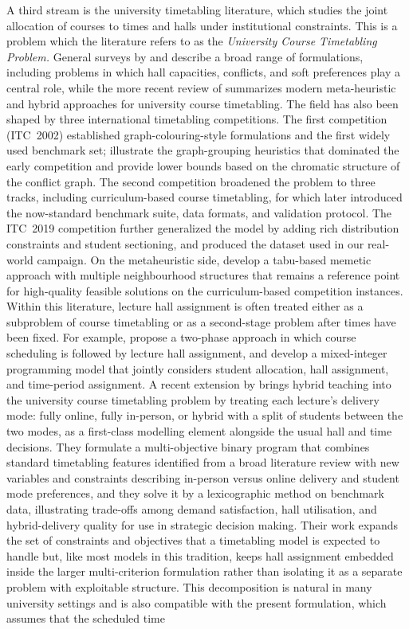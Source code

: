 \documentclass[11pt]{article}
\begin{document}
A third stream is the university timetabling literature, which studies the joint allocation of courses to times and halls under institutional constraints. This is a problem which the literature refers to as the \emph{University Course Timetabling Problem.}
General surveys by \citet{schaerf1999} and \citet{burke2002} describe a broad range of formulations, including problems in which hall capacities, conflicts, and soft preferences play a central role, while the more recent review of \citet{abdipoor2023} summarizes modern meta-heuristic and hybrid approaches for university course timetabling. The field has also been shaped by three international timetabling competitions. The first competition (ITC~2002) established graph-colouring-style formulations and the first widely used benchmark set; \citet{lewis2005} illustrate the graph-grouping heuristics that dominated the early competition and provide lower bounds based on the chromatic structure of the conflict graph. The second competition \citep{mccollum2010} broadened the problem to three tracks, including curriculum-based course timetabling, for which \citet{bonutti2012} later introduced the now-standard benchmark suite, data formats, and validation protocol. The ITC~2019 competition \citep{muller2025itc2019} further generalized the model by adding rich distribution constraints and student sectioning, and produced the dataset used in our real-world campaign. On the metaheuristic side, \citet{abdullah2012} develop a tabu-based memetic approach with multiple neighbourhood structures that remains a reference point for high-quality feasible solutions on the curriculum-based competition instances. Within this literature, lecture hall assignment is often treated either as a subproblem of course timetabling or as a second-stage problem after times have been fixed. For example, \citet{torres2014} propose a two-phase approach in which course scheduling is followed by lecture hall assignment, and \citet{rappos2022} develop a mixed-integer programming model that jointly considers student allocation, hall assignment, and time-period assignment. A recent extension by \citet{davison2025} brings hybrid teaching into the university course timetabling problem by treating each lecture's delivery mode: fully online, fully in-person, or hybrid with a split of students between the two modes, as a first-class modelling element alongside the usual hall and time decisions. They formulate a multi-objective binary program that combines standard timetabling features identified from a broad literature review with new variables and constraints describing in-person versus online delivery and student mode preferences, and they solve it by a lexicographic method on benchmark data, illustrating trade-offs among demand satisfaction, hall utilisation, and hybrid-delivery quality for use in strategic decision making. Their work expands the set of constraints and objectives that a timetabling model is expected to handle but, like most models in this tradition, keeps hall assignment embedded inside the larger multi-criterion formulation rather than isolating it as a separate problem with exploitable structure. This decomposition is natural in many university settings and is also compatible with the present formulation, which assumes that the scheduled time 
\end{document}
